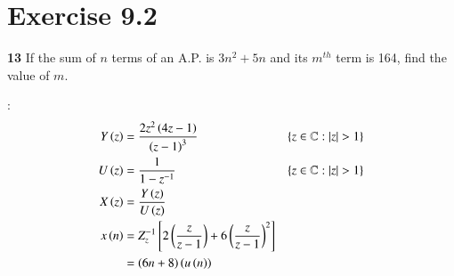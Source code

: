 \documentclass[journal,12pt,twocolumn]{IEEEtran}
\begin{document}


\vspace{3cm}

\title{}
\author{EE23BTECH11054 -  Sai Krishna Shanigarapu$^{*}$
}
\maketitle
\newpage
\bigskip


\section*{Exercise 9.2}

\noindent \textbf{13} \hspace{2pt}If the sum of $n$ terms of an A.P. is $3n^2+5n$ and its $m^{th}$ term is 164, find the value of $m$.
\bigskip

\solution:
\noindent
\begin{align}
Y \left(z\right) &= \frac{2z^2\left(4z-1\right)}{\left(z-1\right)^3} & \left\{z\in\mathbb{C} : |z| > 1\right\}\\
U\left(z\right) &= \frac{1}{1-z^{-1}} & \left\{z\in\mathbb{C} : |z| > 1\right\}\\
X\left(z\right) &=  \frac{Y\left(z\right)}{U\left(z\right)}\\
x\left(n\right) &= Z_{z}^{-1}\left[2\left(\frac{z}{z-1}\right) + 6\left(\frac{z}{z-1}\right) ^2\right]\\
&= \left(6n+8\right)\left(u\left(n\right)\right)
\end{align}
\end{document}
